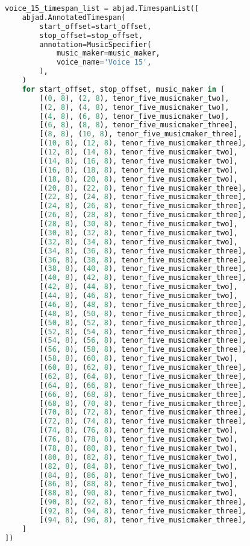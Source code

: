 \begin{lstlisting}[language=Python, caption=Invocation Source Code]
voice_15_timespan_list = abjad.TimespanList([
    abjad.AnnotatedTimespan(
        start_offset=start_offset,
        stop_offset=stop_offset,
        annotation=MusicSpecifier(
            music_maker=music_maker,
            voice_name='Voice 15',
        ),
    )
    for start_offset, stop_offset, music_maker in [
        [(0, 8), (2, 8), tenor_five_musicmaker_two],
        [(2, 8), (4, 8), tenor_five_musicmaker_two],
        [(4, 8), (6, 8), tenor_five_musicmaker_two],
        [(6, 8), (8, 8), tenor_five_musicmaker_three],
        [(8, 8), (10, 8), tenor_five_musicmaker_three],
        [(10, 8), (12, 8), tenor_five_musicmaker_three],
        [(12, 8), (14, 8), tenor_five_musicmaker_two],
        [(14, 8), (16, 8), tenor_five_musicmaker_two],
        [(16, 8), (18, 8), tenor_five_musicmaker_two],
        [(18, 8), (20, 8), tenor_five_musicmaker_two],
        [(20, 8), (22, 8), tenor_five_musicmaker_three],
        [(22, 8), (24, 8), tenor_five_musicmaker_three],
        [(24, 8), (26, 8), tenor_five_musicmaker_three],
        [(26, 8), (28, 8), tenor_five_musicmaker_three],
        [(28, 8), (30, 8), tenor_five_musicmaker_two],
        [(30, 8), (32, 8), tenor_five_musicmaker_two],
        [(32, 8), (34, 8), tenor_five_musicmaker_two],
        [(34, 8), (36, 8), tenor_five_musicmaker_three],
        [(36, 8), (38, 8), tenor_five_musicmaker_three],
        [(38, 8), (40, 8), tenor_five_musicmaker_three],
        [(40, 8), (42, 8), tenor_five_musicmaker_three],
        [(42, 8), (44, 8), tenor_five_musicmaker_two],
        [(44, 8), (46, 8), tenor_five_musicmaker_two],
        [(46, 8), (48, 8), tenor_five_musicmaker_three],
        [(48, 8), (50, 8), tenor_five_musicmaker_three],
        [(50, 8), (52, 8), tenor_five_musicmaker_three],
        [(52, 8), (54, 8), tenor_five_musicmaker_three],
        [(54, 8), (56, 8), tenor_five_musicmaker_three],
        [(56, 8), (58, 8), tenor_five_musicmaker_three],
        [(58, 8), (60, 8), tenor_five_musicmaker_two],
        [(60, 8), (62, 8), tenor_five_musicmaker_three],
        [(62, 8), (64, 8), tenor_five_musicmaker_three],
        [(64, 8), (66, 8), tenor_five_musicmaker_three],
        [(66, 8), (68, 8), tenor_five_musicmaker_three],
        [(68, 8), (70, 8), tenor_five_musicmaker_three],
        [(70, 8), (72, 8), tenor_five_musicmaker_three],
        [(72, 8), (74, 8), tenor_five_musicmaker_three],
        [(74, 8), (76, 8), tenor_five_musicmaker_two],
        [(76, 8), (78, 8), tenor_five_musicmaker_two],
        [(78, 8), (80, 8), tenor_five_musicmaker_two],
        [(80, 8), (82, 8), tenor_five_musicmaker_two],
        [(82, 8), (84, 8), tenor_five_musicmaker_two],
        [(84, 8), (86, 8), tenor_five_musicmaker_two],
        [(86, 8), (88, 8), tenor_five_musicmaker_two],
        [(88, 8), (90, 8), tenor_five_musicmaker_two],
        [(90, 8), (92, 8), tenor_five_musicmaker_three],
        [(92, 8), (94, 8), tenor_five_musicmaker_three],
        [(94, 8), (96, 8), tenor_five_musicmaker_three],
    ]
])


\end{lstlisting}
